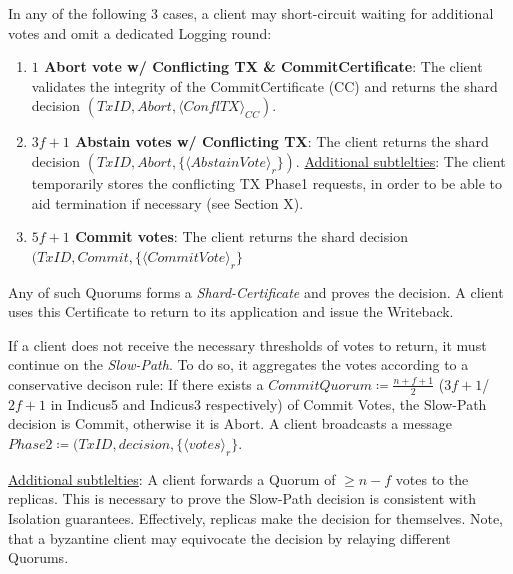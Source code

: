 In any of the following 3 cases, a client may short-circuit waiting for additional votes and omit a dedicated Logging round:
\begin{enumerate}
\item \textbf{$1$ Abort vote w/ Conflicting TX \& CommitCertificate}: The client validates the integrity of the CommitCertificate (CC) and returns the shard decision $(TxID, Abort, \langle ConflTX \rangle_{CC})$.  
\item \textbf{$3f+1$ Abstain votes w/ Conflicting TX}: The client returns the shard decision $(TxID, Abort, \{\langle AbstainVote\rangle_r\})$. 
\underline{Additional subtlelties}: The client temporarily stores the conflicting TX Phase1 requests, in order to be able to aid termination if necessary (see Section X).
\item \textbf{$5f+1$ Commit votes}: The client returns the shard decision $(TxID, Commit, \{\langle CommitVote \rangle_r\}$
\end{enumerate}
Any of such Quorums forms a \textit{Shard-Certificate} and proves the decision. A client uses this Certificate to return to its application and issue the Writeback.

If a client does not receive the necessary thresholds of votes to return, it must continue on the \textit{Slow-Path}. To do so, it aggregates the votes according to a conservative decison rule:
If there exists a $CommitQuorum \coloneqq \frac{n+f+1}{2}$ ($3f+1$/$2f+1$ in Indicus5 and Indicus3 respectively) of Commit Votes, the Slow-Path decision is Commit, otherwise it is Abort.
A client broadcasts a message $Phase2 \coloneqq (TxID, decision, \{\langle votes \rangle_r\}$.

\underline{Additional subtlelties}: A client forwards a Quorum of $\geq n-f$ votes to the replicas. This is necessary to prove the Slow-Path decision is consistent with Isolation guarantees. Effectively, replicas make the decision for themselves. Note, that a byzantine client may equivocate the decision by relaying different Quorums.

